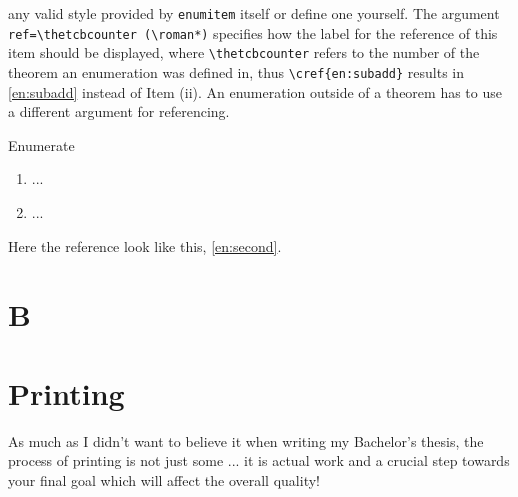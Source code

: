 any valid style provided by \texttt{enumitem} itself or define one yourself. 
The argument 
\lstinline[language={[LaTeX]TeX}]|ref=\thetcbcounter (\roman*)|
specifies how the label for 
the reference of this item should be displayed, where \lstinline[language={[LaTeX]TeX}]|\thetcbcounter| 
refers to the number of the theorem an enumeration was defined in, thus 
\lstinline[language={[LaTeX]TeX}]|\cref{en:subadd}| results in \cref{en:subadd} 
instead of \textcolor{\colmain}{Item (ii)}. An enumeration outside of a theorem has to use a different
argument for referencing.
\begin{lstbox}[]{Enumerate}
\begin{enumerate}[label=(K\theenumi), ref=MyEnum (K\theenumi)]
\item ... %
\item\label{en:second} ... %
\end{enumerate} 
\end{lstbox}
Here the reference look like this, \cref{en:second}.

\section{B}
\kant
{}
\pagediagram
\section{Printing}\label{sec:printing}
As much as I didn't 
want to believe it when writing my Bachelor's thesis, the process of printing is not just 
some ... it is actual work and a crucial step towards your final goal which will affect 
the overall quality!